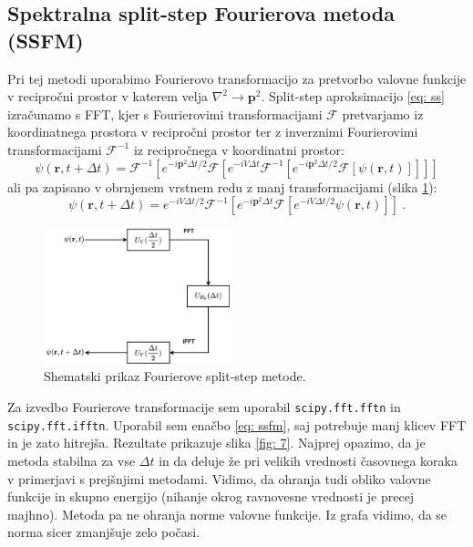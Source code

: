 \documentclass[11pt]{report}
\newcommand{\rr}{\mathbf{r}}
\begin{document}
\subsection{Spektralna split-step Fourierova metoda (SSFM)}
Pri tej metodi uporabimo Fourierovo transformacijo za pretvorbo valovne funkcije v recipročni prostor v katerem velja
$\nabla^2 \rightarrow \mathbf{p}^2$. Split-step aproksimacijo \ref{eq: ss} izračunamo s FFT, kjer
s Fourierovimi transformacijami $\mathcal{F}$ pretvarjamo iz koordinatnega prostora v recipročni prostor ter
z inverznimi Fourierovimi transformacijami $\mathcal{F}^{-1}$ iz recipročnega v koordinatni prostor:
\begin{equation}
	\psi(\rr, t + \Delta t) =
	\mathcal{F}^{-1}
	\left [ e^{-i \mathbf{p}^2 \Delta t/2} \mathcal{F} \left [ e^{-i V \Delta t} \mathcal{F}^{-1} \left [ e^{-i \mathbf{p}^2 \Delta t/2} \mathcal{F} \left [ \psi(\rr, t)
					\right ]
				\right ]
			\right ]
		\right  ]
\end{equation}
ali pa zapisano v obrnjenem vrstnem redu z manj transformacijami (slika \ref{fig: 6}):
\begin{equation}
	\label{eq: ssfm}
	\psi(\rr, t + \Delta t) = e^{-iV\Delta t/2} \mathcal{F}^{-1} \left [
		e^{-i\mathbf{p}^2 \Delta t} \mathcal{F} \left [
			e^{-iV\Delta t /2} \psi (\rr, t)
			\right ]
		\right ] \>.
\end{equation}

\begin{figure}[h!]
	\centering
	\includegraphics[width=0.48\textwidth]{ssfm.png}
	\caption{Shematski prikaz Fourierove split-step metode.}
	\label{fig: 6}
\end{figure}

\newpage
\noindent
Za izvedbo Fourierove transformacije sem uporabil \texttt{scipy.fft.fftn} in \texttt{scipy.fft.ifftn}.
Uporabil sem enačbo \ref{eq: ssfm}, saj potrebuje manj klicev FFT in je zato hitrejša.
Rezultate prikazuje slika \ref{fig: 7}. Najprej opazimo, da je metoda stabilna za vse $\Delta t$ in da
deluje že pri velikih vrednosti časovnega koraka v primerjavi s prejšnjimi metodami.
Vidimo, da ohranja tudi obliko valovne funkcije in skupno energijo (nihanje okrog ravnovesne vrednosti je precej majhno).
Metoda pa ne ohranja norme valovne funkcije. Iz grafa vidimo, da se norma sicer zmanjšuje zelo počasi.
\end{document}
